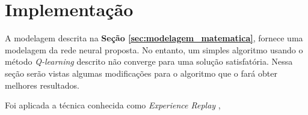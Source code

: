 
\section{Implementação} %
\label{sec:implementacao}





A modelagem descrita na \textbf{Seção \ref{sec:modelagem_matematica}}, fornece uma modelagem da rede neural proposta. No entanto, um simples algoritmo usando o método \textit{Q-learning} descrito não converge para uma solução satisfatória. Nessa seção serão vistas algumas modificações para o algoritmo que o fará obter melhores resultados.


Foi aplicada a técnica conhecida como \textit{Experience Replay} \cite{Lin1992ReinforcementLF},


